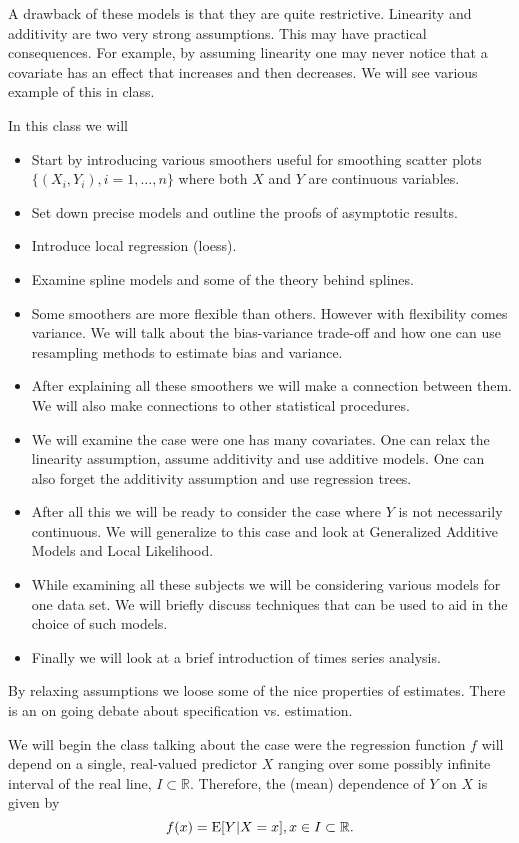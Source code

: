 A drawback of these models is that they are quite
restrictive. Linearity and additivity are two very strong
assumptions. This may have practical consequences. For example, by
assuming  linearity one may never notice that a covariate
has an effect that increases and then decreases. We will see various
example of this in class. 

In this class we will
\begin{itemize}

\item Start by introducing various smoothers useful for smoothing
  scatter plots $\{ (X_i, Y_i), i=1,\dots,n \}$ where both $X$ and $Y$
  are continuous variables.
\item Set down precise models and outline the proofs of asymptotic
  results.
\item Introduce local regression (loess).
\item Examine spline models and some of the theory behind splines.
\item Some smoothers are more flexible than others. However with
  flexibility comes variance. We will talk about the bias-variance
  trade-off and how one can use resampling methods to estimate bias
  and variance.
\item After explaining all these smoothers we will make a connection
  between them. We will also make connections to other statistical
  procedures.
\item We will examine the case were one has many covariates. One can
  relax the linearity assumption, 
  assume additivity and use additive models. One can also forget the
  additivity assumption and 
  use regression trees.
\item After all this we will be ready to consider the case where $Y$
  is not necessarily continuous. We will generalize to this case and
  look at Generalized Additive Models and Local Likelihood.
\item While examining all these subjects we will be considering
  various models for one data set. We will briefly discuss techniques
  that can be used to aid in the choice of such models.
\item Finally we will look at a brief introduction of times series
  analysis.
\end{itemize}

By relaxing assumptions we loose some of the nice properties of
estimates. There is an on going debate about specification
vs. estimation.


We will begin the class talking about the case were the regression
function $f$ will depend on a 
single, real-valued predictor $X$ ranging over some possibly infinite
interval of the real line, $I \subset \mathbb{R}$. Therefore, the
(mean) dependence of $Y$ on $X$ is given by
\begin{equation}
\label{regfunc}
f(x) = \mbox{E}[Y|X=x], x \in I \subset \mathbb{R}.
\end{equation}

